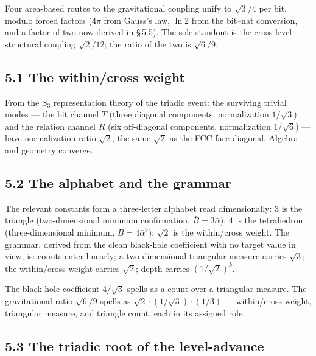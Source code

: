 \documentclass[11pt,oneside]{report}
\theoremstyle{definition}
\theoremstyle{remark}
\begin{document}
Four area-based routes to the gravitational coupling unify to
\ensuremath{\sqrt{3}/4} per bit, modulo forced factors (\ensuremath{4\pi}
from Gauss's law, \ensuremath{\ln 2} from the bit--nat conversion, and a
factor of two now derived in \S\,5.5). The sole standout is the cross-level
structural coupling \ensuremath{\sqrt{2}/12}; the ratio of the two is
\ensuremath{\sqrt{6}/9}.

\subsection*{5.1 The within/cross weight}

From the \ensuremath{S_3} representation theory of the triadic event: the
surviving trivial modes --- the bit channel \ensuremath{T} (three diagonal
components, normalization \ensuremath{1/\sqrt{3}}) and the relation channel
\ensuremath{R} (six off-diagonal components, normalization
\ensuremath{1/\sqrt{6}}) --- have normalization ratio \ensuremath{\sqrt{2}},
the same \ensuremath{\sqrt{2}} as the FCC face-diagonal. Algebra and
geometry converge.

\subsection*{5.2 The alphabet and the grammar}

The relevant constants form a three-letter alphabet read dimensionally:
\ensuremath{3} is the triangle (two-dimensional minimum confirmation,
\ensuremath{\bar{B} = 3\bar{\alpha}}); \ensuremath{4} is the tetrahedron
(three-dimensional minimum, \ensuremath{\bar{B} = 4\bar{\alpha}^3});
\ensuremath{\sqrt{2}} is the within/cross weight. The grammar, derived
from the clean black-hole coefficient with no target value in view, is:
counts enter linearly; a two-dimensional triangular measure carries
\ensuremath{\sqrt{3}}; the within/cross weight carries \ensuremath{\sqrt{2}};
depth carries \ensuremath{(1/\sqrt{2})^k}.

The black-hole coefficient \ensuremath{4/\sqrt{3}} spells as a count over a
triangular measure. The gravitational ratio \ensuremath{\sqrt{6}/9} spells
as \ensuremath{\sqrt{2} \cdot (1/\sqrt{3}) \cdot (1/3)} --- within/cross
weight, triangular measure, and triangle count, each in its assigned
role.

\subsection*{5.3 The triadic root of the level-advance}
\end{document}
